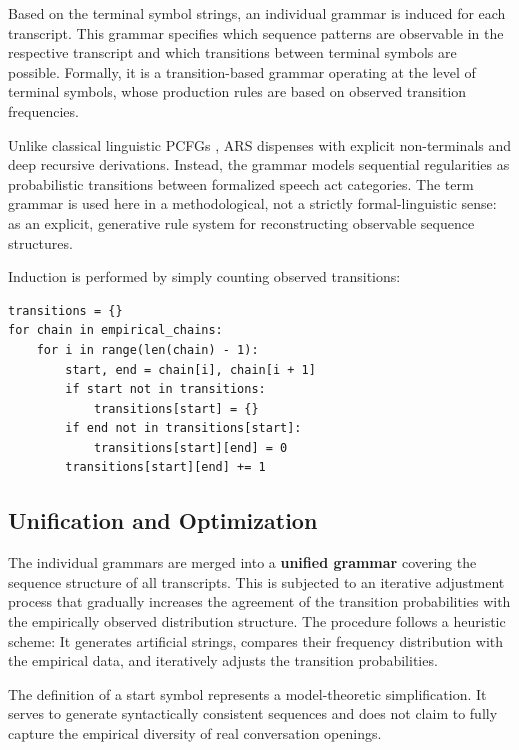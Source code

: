 \documentclass[
  12pt,
  a4paper,
  oneside,
  titlepage
]{article}
\begin{document}
Based on the terminal symbol strings, an individual grammar is induced for each 
transcript. This grammar specifies which sequence patterns are observable in the 
respective transcript and which transitions between terminal symbols are possible. 
Formally, it is a transition-based grammar operating at the level of terminal symbols, 
whose production rules are based on observed transition frequencies.

Unlike classical linguistic PCFGs \citep{Manning1999}, ARS dispenses with explicit 
non-terminals and deep recursive derivations. Instead, the grammar models sequential 
regularities as probabilistic transitions between formalized speech act categories. 
The term grammar is used here in a methodological, not a strictly formal-linguistic 
sense: as an explicit, generative rule system for reconstructing observable sequence 
structures.

Induction is performed by simply counting observed transitions:

\begin{lstlisting}[caption=Counting Transitions between Terminal Symbols]
transitions = {}
for chain in empirical_chains:
    for i in range(len(chain) - 1):
        start, end = chain[i], chain[i + 1]
        if start not in transitions:
            transitions[start] = {}
        if end not in transitions[start]:
            transitions[start][end] = 0
        transitions[start][end] += 1
\end{lstlisting}

\subsection{Unification and Optimization}

The individual grammars are merged into a \textbf{unified grammar} covering the 
sequence structure of all transcripts. This is subjected to an iterative adjustment 
process that gradually increases the agreement of the transition probabilities with 
the empirically observed distribution structure. The procedure follows a heuristic 
scheme: It generates artificial strings, compares their frequency distribution with 
the empirical data, and iteratively adjusts the transition probabilities.

The definition of a start symbol represents a model-theoretic simplification. It 
serves to generate syntactically consistent sequences and does not claim to fully 
capture the empirical diversity of real conversation openings.
\end{document}
